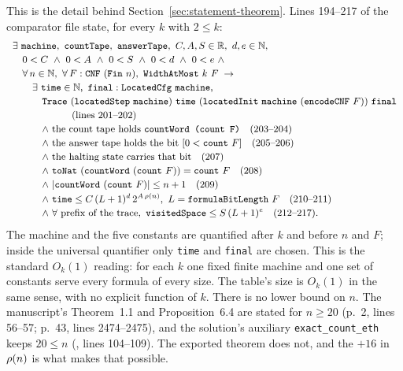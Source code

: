 This is the detail behind Section~\ref{sec:statement-theorem}. Lines
194--217 of the comparator file state, for every \(k\) with \(2 \le k\):
\[
\small
\begin{array}{l}
\exists\ \mathtt{machine},\ \mathtt{countTape},\ \mathtt{answerTape},\
  C, A, S \in \mathbb{R},\ d, e \in \mathbb{N},\\[2pt]
\quad 0 < C \ \wedge\ 0 < A \ \wedge\ 0 < S \ \wedge\ 0 < d \ \wedge\ 0 < e\ \wedge\\[2pt]
\quad \forall\, n \in \mathbb{N},\ \forall\, F : \mathtt{CNF}\ (\mathtt{Fin}\ n),\
  \mathtt{WidthAtMost}\ k\ F \;\rightarrow\\[2pt]
\qquad \exists\ \mathtt{time} \in \mathbb{N},\ \mathtt{final} : \mathtt{LocatedCfg}\ \mathtt{machine},\\[2pt]
\qquad\quad \mathtt{Trace}\ (\mathtt{locatedStep}\ \mathtt{machine})\ \mathtt{time}\
  (\mathtt{locatedInit}\ \mathtt{machine}\ (\mathtt{encodeCNF}\ F))\ \mathtt{final}\\[2pt]
\qquad\qquad\qquad\text{(lines 201--202)}\\[2pt]
\qquad\quad \wedge\ \text{the count tape holds \texttt{countWord (count F)}}
  \quad\text{(203--204)}\\[2pt]
\qquad\quad \wedge\ \text{the answer tape holds the bit \([0 < \mathtt{count}\ F]\)}
  \quad\text{(205--206)}\\[2pt]
\qquad\quad \wedge\ \text{the halting state carries that bit}
  \quad\text{(207)}\\[2pt]
\qquad\quad \wedge\ \mathtt{toNat}\ (\mathtt{countWord}\ (\mathtt{count}\ F)) = \mathtt{count}\ F
  \quad\text{(208)}\\[2pt]
\qquad\quad \wedge\ |\mathtt{countWord}\ (\mathtt{count}\ F)| \le n + 1
  \quad\text{(209)}\\[2pt]
\qquad\quad \wedge\ \mathtt{time} \le C\,(L+1)^d\,2^{A\,\rhon},\ L = \mathtt{formulaBitLength}\ F
  \quad\text{(210--211)}\\[2pt]
\qquad\quad \wedge\ \forall\ \text{prefix of the trace},\
  \mathtt{visitedSpace} \le S\,(L+1)^e
  \quad\text{(212--217).}
\end{array}
\]
The machine and the five constants are quantified after \(k\) and before
\(n\) and \(F\); inside the universal quantifier only \texttt{time} and
\texttt{final} are chosen. This is the standard \(O_k(1)\) reading: for
each \(k\) one fixed finite machine and one set of constants serve every
formula of every size. The table's size is \(O_k(1)\) in the same sense,
with no explicit function of \(k\). There is no lower bound on \(n\). The
manuscript's Theorem~1.1 and Proposition~6.4 are stated for \(n \ge 20\)
(p.~2, lines 56--57; p.~43, lines 2474--2475), and the solution's
auxiliary \texttt{exact\_count\_eth} keeps \(20 \le n\)
(\clonefile{SqrtLogSpace/Final.lean}, lines 104--109). The exported
theorem does not, and the \(+16\) in \(\rho(n)\) is what makes that
possible.

